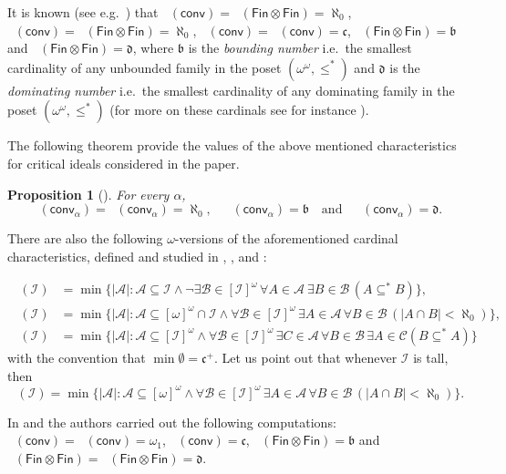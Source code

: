 \documentclass{amsart}
\theoremstyle{plain}
\newtheorem{proposition}[theorem]{Proposition}
\theoremstyle{definition}
\theoremstyle{remark}
\newcommand{\cA}{\mathcal{A}}
\newcommand{\cB}{\mathcal{B}}
\newcommand{\cI}{\mathcal{I}}
\newcommand{\I}{\cI}
\newcommand{\continuum}{\mathfrak{c}}
\newcommand{\bnumber}{\mathfrak{b}}
\newcommand{\dnumber}{\mathfrak{d}}
\DeclareMathOperator{\add}{add}
\DeclareMathOperator{\non}{non}
\DeclareMathOperator{\cov}{cov}
\DeclareMathOperator{\cof}{cof}
\DeclareMathOperator{\adds}{\add^*}
\DeclareMathOperator{\addo}{\add^*_{\omega}}
\DeclareMathOperator{\nons}{\non^*}
\DeclareMathOperator{\nono}{\non^*_{\omega}}
\DeclareMathOperator{\covs}{\cov^*}
\DeclareMathOperator{\cofs}{\cof^*}
\DeclareMathOperator{\cofo}{\cof^*_{\omega}}
\newcommand{\FIN}{\mathsf{Fin}}
\newcommand{\Fin}{\FIN}
\newcommand{\conv}{\mathsf{conv}}
\renewcommand{\subset}{\subseteq}
\begin{document}
It is known (see e.g.~\cite{MR2777744}) that 
$\adds(\conv)=\adds(\Fin\otimes\Fin)=\aleph_0$,
$\nons(\conv)=\nons(\Fin\otimes\Fin)=\aleph_0$,
$\covs(\conv)=\cofs(\conv)=\continuum$, 
$\covs(\Fin\otimes\Fin)=\bnumber$ and  $\cofs(\Fin\otimes\Fin)=\dnumber$, where
$\bnumber$  is the \emph{bounding number} i.e.~the smallest cardinality of any unbounded family in the poset $(\omega^\omega,\leq^*)$ and 
$\dnumber$ is the \emph{dominating number} i.e.~the smallest cardinality of
any dominating family in the poset $(\omega^\omega,\leq^*)$ (for more on these cardinals see for instance \cite{MR2768685}). 

The following theorem provide the values of the above mentioned characteristics for critical ideals considered in the paper.
\begin{proposition}[\cite{critical-ideals-RF-MK-AK}] 
For every $\alpha$, 
$$\nons(\conv_\alpha) = \adds(\conv_\alpha)= \aleph_0, \quad 
\covs(\conv_\alpha)= \bnumber\quad\text{and} \quad \cofs(\conv_\alpha)=\dnumber.$$
\end{proposition}

There are also the following $\omega$-versions of the aforementioned cardinal characteristics, defined and studied in \cite{MR1686797}, \cite{Alek-Miller-Nulls}, \cite{Alek-Arturo-Miller-Trees}  and  \cite{MR4905423}:


\begin{equation*}
\begin{split}
\addo(\I) & =\min\{|\cA|:\cA\subseteq\I\land \neg \exists \cB\in[\I]^\omega \, \forall A\in\cA \ \exists B\in\mathcal{B} \, (A\subset^* B)\}, \\
\nono(\I) & = \min\{|\cA|:\cA\subseteq [\omega]^\omega\cap \I\land \forall \mathcal{B}\in[\I]^\omega \, \exists A\in\cA \, \forall B\in\mathcal{B} \, (|A\cap B|<\aleph_0)\}, \\
\cofo(\I) & =\min\{|\cA|:\cA\subseteq[\I]^\omega\land \forall \mathcal{B}\in[\I]^\omega \, \exists C\in\cA \, \forall B\in\mathcal{B} \, \exists A\in\mathcal{C} (B\subset^* A)\}
\end{split}
\end{equation*}
with the convention that $\min\emptyset=\continuum^+$.
Let us point out that whenever $\I$ is tall, then 
$$\nono(\I)  = \min\{|\cA|:\cA\subseteq [\omega]^\omega\land \forall \mathcal{B}\in[\I]^\omega \, \exists A\in\cA \, \forall B\in\mathcal{B} \, (|A\cap B|<\aleph_0)\}.$$

In \cite{Alek-Arturo-Miller-Trees} and  \cite{MR4905423} the authors carried out the following computations:
$\addo(\conv)=\nono(\conv)=\omega_1$,  
$\cofo(\conv)=\continuum$, 
$\addo(\Fin\otimes\Fin)=\bnumber$ and  $\nono(\Fin\otimes\Fin)=\cofo(\Fin\otimes\Fin)=\dnumber$.
\end{document}
